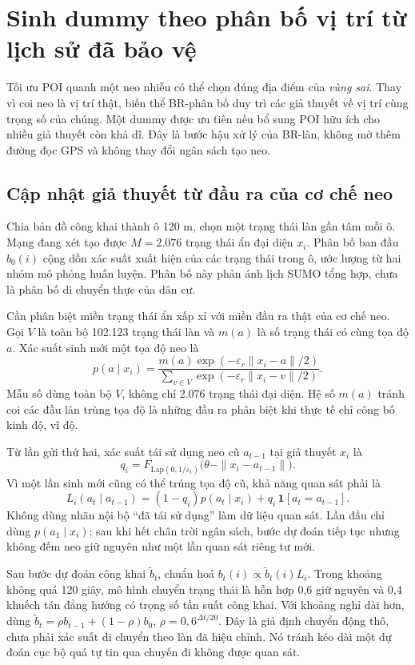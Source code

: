 \section{Sinh dummy theo phân bố vị trí từ lịch sử đã bảo vệ}
\label{sec:belief-method}

Tối ưu POI quanh một neo nhiễu có thể chọn đúng địa điểm của \emph{vùng sai}. Thay vì coi neo là vị trí thật, biến thể BR-phân bố duy trì các giả thuyết về vị trí cùng trọng số của chúng. Một dummy được ưu tiên nếu bổ sung POI hữu ích cho nhiều giả thuyết còn khả dĩ. Đây là bước hậu xử lý của BR-làn, không mở thêm đường đọc GPS và không thay đổi ngân sách tạo neo.

\subsection{Cập nhật giả thuyết từ đầu ra của cơ chế neo}

Chia bản đồ công khai thành ô 120 m, chọn một trạng thái làn gần tâm mỗi ô. Mạng đang xét tạo được $M=2.076$ trạng thái ẩn đại diện $x_i$. Phân bố ban đầu $b_0(i)$ cộng dồn xác suất xuất hiện của các trạng thái trong ô, ước lượng từ hai nhóm mô phỏng huấn luyện. Phân bố này phản ánh lịch SUMO tổng hợp, chưa là phân bố di chuyển thực của dân cư.

Cần phân biệt miền trạng thái ẩn xấp xỉ với miền đầu ra thật của cơ chế neo. Gọi $V$ là toàn bộ 102.123 trạng thái làn và $m(a)$ là số trạng thái có cùng tọa độ $a$. Xác suất sinh mới một tọa độ neo là
\[
p(a\mid x_i)=\frac{m(a)\exp(-\varepsilon_r\|x_i-a\|/2)}
{\sum_{v\in V}\exp(-\varepsilon_r\|x_i-v\|/2)}.
\]
Mẫu số dùng toàn bộ $V$, không chỉ 2.076 trạng thái đại diện. Hệ số $m(a)$ tránh coi các đầu làn trùng tọa độ là những đầu ra phân biệt khi thực tế chỉ công bố kinh độ, vĩ độ.

Từ lần gửi thứ hai, xác suất tái sử dụng neo cũ $a_{t-1}$ tại giả thuyết $x_i$ là
\[
q_i=F_{\mathrm{Lap}(0,1/\varepsilon_t)}
\bigl(\theta-\|x_i-a_{t-1}\|\bigr).
\]
Vì một lần sinh mới cũng có thể trúng tọa độ cũ, khả năng quan sát phải là
\[
L_i(a_t\mid a_{t-1})=(1-q_i)p(a_t\mid x_i)
+q_i\,\mathbf 1[a_t=a_{t-1}].
\]
Không dùng nhãn nội bộ ``đã tái sử dụng'' làm dữ liệu quan sát. Lần đầu chỉ dùng $p(a_1\mid x_i)$; sau khi hết chân trời ngân sách, bước dự đoán tiếp tục nhưng không đếm neo giữ nguyên như một lần quan sát riêng tư mới.

Sau bước dự đoán công khai $\widetilde b_t$, chuẩn hoá
$b_t(i)\propto \widetilde b_t(i)L_i$.
Trong khoảng không quá 120 giây, mô hình chuyển trạng thái là hỗn hợp 0,6 giữ nguyên và 0,4 khuếch tán đẳng hướng có trọng số tần suất công khai. Với khoảng nghỉ dài hơn, dùng
$\widetilde b_t=\rho b_{t-1}+(1-\rho)b_0$,
$\rho=0{,}6^{\Delta t/20}$.
Đây là giả định chuyển động thô, chưa phải xác suất di chuyển theo làn đã hiệu chỉnh. Nó tránh kéo dài một dự đoán cục bộ quá tự tin qua chuyến đi không được quan sát.

